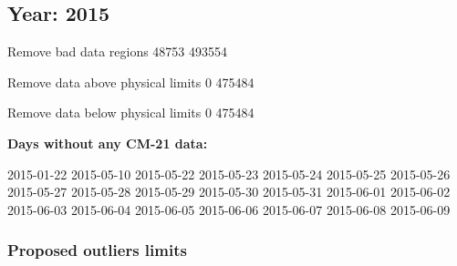 \documentclass[
  10pt,
  a4paper,oneside]{article}
\begin{document}
\FloatBarrier

\newpage

\hypertarget{year-2015}{%
\subsection{Year: 2015}\label{year-2015}}

Remove bad data regions
48753 493554

Remove data above physical limits
0 475484

Remove data below physical limits
0 475484

\textbf{Days without any CM-21 data:}

2015-01-22 2015-05-10 2015-05-22 2015-05-23 2015-05-24 2015-05-25 2015-05-26 2015-05-27 2015-05-28 2015-05-29 2015-05-30 2015-05-31 2015-06-01 2015-06-02 2015-06-03 2015-06-04 2015-06-05 2015-06-06 2015-06-07 2015-06-08 2015-06-09

\hypertarget{proposed-outliers-limits-22}{%
\subsubsection{Proposed outliers limits}\label{proposed-outliers-limits-22}}

\footnotesize
\end{document}
